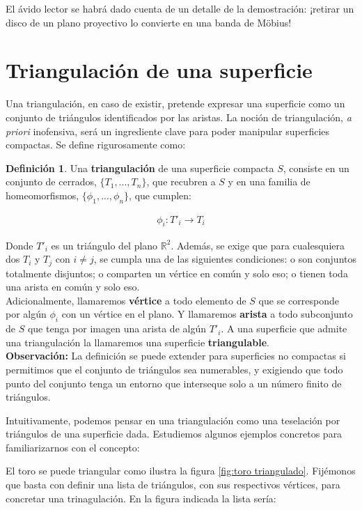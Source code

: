\documentclass[a4paper,11pt,spanish, twoside, leqno]{tfg-uam}
\theoremstyle{definition}
\newtheorem{defin}[teor]{Definici\'on}
\begin{document}
El ávido lector se habrá dado cuenta de un detalle de la demostración: ¡retirar un disco de un plano proyectivo lo convierte en una banda de M\"obius!


\section{Triangulación de una superficie}
Una triangulación, en caso de existir, pretende expresar una superficie como un conjunto de triángulos identificados por las aristas. La noción de triangulación, \textit{a priori} inofensiva, será un ingrediente clave para poder manipular superficies compactas. Se define rigurosamente como:

\begin{defin}\label{defin:triangulacion}
Una \textbf{triangulación} de una superficie compacta $S$, consiste en un conjunto de cerrados, $\{T_1, ..., T_n\}$, que recubren a $S$ y en una familia de homeomorfismos, $\{\phi_1, ..., \phi_n\}$, que cumplen:

\begin{align*}
	\phi_i: T'_i \longrightarrow T_i
\end{align*}

Donde $T'_i$ es un triángulo del plano $\mathbb{R}^2$.
Además, se exige que para cualesquiera dos $T_i$ y $T_j$ con $i\neq j$, se cumpla una de las siguientes condiciones: o son conjuntos totalmente disjuntos; o comparten un vértice en común y solo eso; o tienen toda una arista en común y solo eso.\\
Adicionalmente, llamaremos \textbf{vértice} a todo elemento de $S$ que se corresponde por algún $\phi_i$ con un vértice en el plano. Y llamaremos \textbf{arista} a todo subconjunto de $S$ que tenga por imagen una arista de algún $T'_i$. A una superficie que admite una triangulación la llamaremos una superficie \textbf{triangulable}.\\
\textbf{Observación:} La definición se puede extender para superficies no compactas si permitimos que el conjunto de triángulos sea numerables, y exigiendo que todo punto del conjunto tenga un entorno que interseque solo a un número finito de triángulos.
\end{defin}


Intuitivamente, podemos pensar en una triangulación como una teselación por triángulos de una superficie dada. Estudiemos algunos ejemplos concretos para familiarizarnos con el concepto:

El toro se puede triangular como ilustra la figura  \ref{fig:toro triangulado}. Fijémonos que basta con definir una lista de triángulos, con sus respectivos vértices, para concretar una trinagulación. En la figura indicada la lista sería:
\end{document}
